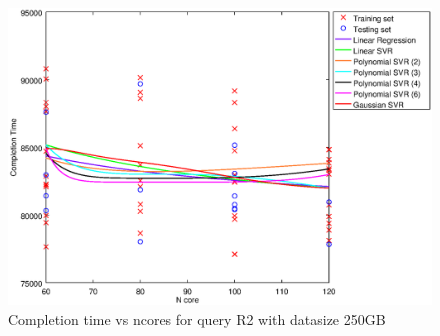 
\begin {figure}[hbtp]
\centering
\includegraphics[width=\textwidth]{output/R2_250_ONLY_1_OVER_NCORES/plot_R2_250.eps}
\caption{Completion time vs ncores for query R2 with datasize 250GB}
\label{fig:all_nonlinear_R2_250}
\end {figure}
